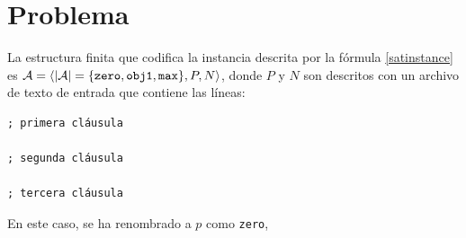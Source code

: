 \section{Problema}
La estructura finita que codifica la instancia descrita por la fórmula
\ref{satinstance} es $\mathcal{A} = \langle |\mathcal{A}| = \{\texttt{zero}, \texttt{obj1},
\texttt{max}\}, P, N \rangle$, donde $P$ y $N$ son descritos con un archivo de texto
de entrada que contiene las líneas:

\begin{verbatim}
; primera cláusula

; segunda cláusula

; tercera cláusula
\end{verbatim}

En este caso, se ha renombrado a $p$ como \texttt{zero}, 


